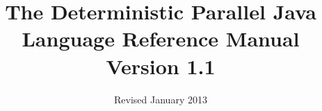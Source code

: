\documentclass[10pt]{article}
\title{\bfseries{The Deterministic Parallel Java \\
Language Reference Manual \\
Version 1.1}}
\date{Revised January 2013}
\begin{document}
\maketitle

\tableofcontents{}

\begin{sloppypar}









\end{sloppypar}
\end{document}
